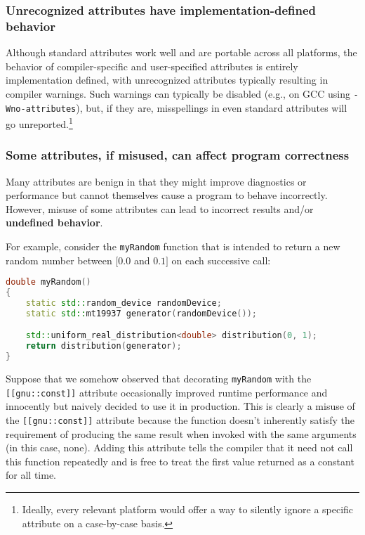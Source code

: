 \subsubsection[Unrecognized attributes have implementation-defined behavior]{Unrecognized attributes have implementation-defined behavior}\label{unrecognized-attributes-have-implementation-defined-behavior}

Although standard attributes work well and are portable across all
platforms, the behavior of compiler-specific and user-specified
attributes is entirely implementation defined, with unrecognized
attributes typically resulting in compiler warnings. Such warnings can typically be disabled (e.g., on GCC using
\texttt{-Wno-attributes}), but, if they are, misspellings in even standard
attributes will go unreported.{\cprotect\footnote{Ideally, every relevant platform would offer a way to silently ignore a specific
  attribute on a case-by-case basis.}}

\subsubsection[Some attributes, if misused, can affect program correctness]{Some attributes, if misused, can affect program correctness}\label{some-attributes,-if-misused,-can-affect-program-correctness}

Many attributes are benign in that they might improve diagnostics or
performance but cannot themselves cause a program to behave incorrectly.
However, misuse of some attributes can lead to incorrect
results and/or \textbf{undefined behavior}.

For example, consider the \texttt{myRandom} function that is intended to
return a new random number between $[0.0$ and $0.1]$ on each successive
call:

\begin{lstlisting}[language=C++]
double myRandom()
{
    static std::random_device randomDevice;
    static std::mt19937 generator(randomDevice());

    std::uniform_real_distribution<double> distribution(0, 1);
    return distribution(generator);
}
\end{lstlisting}

\noindent Suppose that we somehow observed that decorating \texttt{myRandom} with
the \texttt{[[gnu::const]]} attribute occasionally improved runtime
performance and innocently but naively decided to use it in production. This
is clearly a misuse of the \texttt{[[gnu::const]]} attribute because the
function doesn't inherently satisfy the requirement of producing the
same result when invoked with the same arguments (in this case, none).
Adding this attribute tells the compiler that it need not call this
function repeatedly and is free to treat the first value returned as a
constant for all time.


